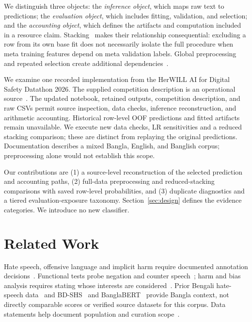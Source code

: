 \documentclass[doublecolumn]{ijcvsplatex}
\newcommand{\CompetitionName}{the HerWILL AI for Digital Safety Datathon 2026}
\begin{document}
We distinguish three objects: the \emph{inference object}, which maps raw text to predictions; the \emph{evaluation object}, which includes fitting, validation, and selection; and the \emph{accounting object}, which defines the artifacts and computation included in a resource claim. Stacking~\cite{wolpert1992stacked} makes their relationship consequential: excluding a row from its own base fit does not necessarily isolate the full procedure when meta training features depend on meta validation labels. Global preprocessing and repeated selection create additional dependencies~\cite{varma2006bias,cawley2010overfitting,kapoor2023leakage}.

We examine one recorded implementation from \CompetitionName. The supplied competition description is an operational source~\cite{herwill2026materials}. The updated notebook, retained outputs, competition description, and raw CSVs permit source inspection, data checks, inference reconstruction, and arithmetic accounting. Historical row-level OOF predictions and fitted artifacts remain unavailable. We execute new data checks, LR sensitivities and a reduced stacking comparison; these are distinct from replaying the original predictions. Documentation describes a mixed Bangla, English, and Banglish corpus; preprocessing alone would not establish this scope.

Our contributions are (1) a source-level reconstruction of the selected prediction and accounting paths, (2) full-data preprocessing and reduced-stacking comparisons with saved row-level probabilities, and (3) duplicate diagnostics and a tiered evaluation-exposure taxonomy. Section~\ref{sec:design} defines the evidence categories. We introduce no new classifier.

\section{Related Work}
\label{sec:related}
Hate speech, offensive language and implicit harm require documented annotation decisions~\cite{davidson2017automated}. Functional tests probe negation and counter speech~\cite{rottger2021hatecheck}; harm and bias analysis requires stating whose interests are considered~\cite{blodgett2020language}. Prior Bengali hate-speech data~\cite{romim2020bengali} and BD-SHS~\cite{romim2022bdshs} and BanglaBERT~\cite{bhattacharjee2022banglabert} provide Bangla context, not directly comparable scores or verified source datasets for this corpus. Data statements help document population and curation scope~\cite{bender2018datastatements}.
\end{document}
